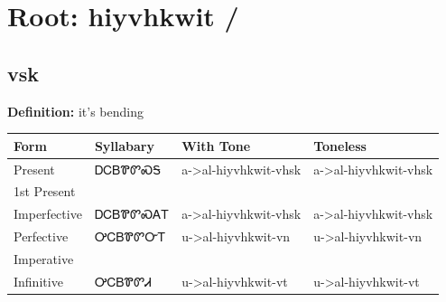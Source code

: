 \documentclass{article}%
\begin{document}
%
\normalsize%
\section*{Root: hiyvhkwit / }%
\subsection*{vsk}%
\textbf{Definition: }%
it’s bending%
\\[0.5em]%
\begin{tabular}{|l|l|l|l|}%
\hline%
\textbf{Form}&\textbf{Syllabary}&\textbf{With Tone}&\textbf{Toneless}\\%
\hline%
Present&ᎠᏟᏴᏈᏛᏍᎦ&a{-}>al{-}hiyvhkwit{-}vhsk&a{-}>al{-}hiyvhkwit{-}vhsk\\%
1st Present&&&\\%
Imperfective&ᎠᏟᏴᏈᏛᏍᎪᎢ&a{-}>al{-}hiyvhkwit{-}vhsk&a{-}>al{-}hiyvhkwit{-}vhsk\\%
Perfective&ᎤᏟᏴᏈᏛᏅᎢ&u{-}>al{-}hiyvhkwit{-}vn&u{-}>al{-}hiyvhkwit{-}vn\\%
Imperative&&&\\%
Infinitive&ᎤᏟᏴᏈᏛᏗ&u{-}>al{-}hiyvhkwit{-}vt&u{-}>al{-}hiyvhkwit{-}vt\\%
\hline%
\end{tabular}%
\\[1em]%
\end{document}
